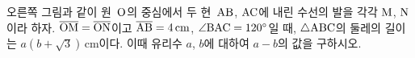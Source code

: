 \noindent\begin{minipage}[t]{0.58\linewidth}\vspace{0pt}\raggedright 오른쪽 그림과 같이 원~$\mathrm{O}$의 중심에서 두 현~$\mathrm{AB}$, $\mathrm{AC}$에 내린 수선의 발을 각각 $\mathrm{M}$, $\mathrm{N}$이라 하자. $\overline{\mathrm{OM}}=\overline{\mathrm{ON}}$이고 $\overline{\mathrm{AB}}=4\,\mathrm{cm}$, $\angle\mathrm{BAC}=120^\circ$일 때, $\triangle\mathrm{ABC}$의 둘레의 길이는 $a(b+\sqrt{3})\,\mathrm{cm}$이다. 이때 유리수 $a$, $b$에 대하여 $a-b$의 값을 구하시오.\end{minipage}\hfill\begin{minipage}[t]{0.4\linewidth}\vspace{0pt}\centering \resizebox{\ifdim\width>\linewidth\linewidth\else\width\fi}{!}{}\end{minipage}\par
